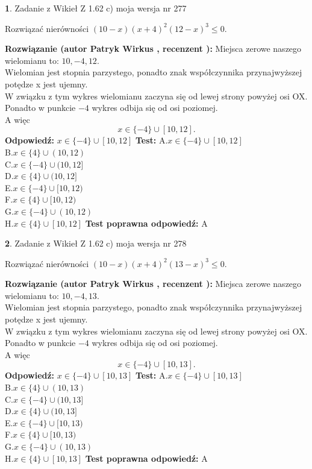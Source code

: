 \documentclass[12pt, a4paper]{article}
\theoremstyle{definition} %
\newtheorem{zad}{}
\newcommand{\zadStart}[1]{\begin{zad}#1\newline}
\newcommand{\zadStop}{\end{zad}}
\newcommand{\rozwStart}[2]{\noindent \textbf{Rozwiązanie (autor #1 , recenzent #2): }\newline}
\newcommand{\rozwStop}{\newline}
\newcommand{\odpStart}{\noindent \textbf{Odpowiedź:}\newline}
\newcommand{\odpStop}{\newline}
\newcommand{\testStart}{\noindent \textbf{Test:}\newline}
\newcommand{\testStop}{\newline}
\newcommand{\kluczStart}{\noindent \textbf{Test poprawna odpowiedź:}\newline}
\newcommand{\kluczStop}{\newline}
\begin{document}
\zadStart{Zadanie z Wikieł Z 1.62 c) moja wersja nr 277}

Rozwiązać nierówności $(10-x)(x+4)^{2}(12-x)^{3}\le0$.
\zadStop
\rozwStart{Patryk Wirkus}{}
Miejsca zerowe naszego wielomianu to: $10, -4, 12$.\\
Wielomian jest stopnia parzystego, ponadto znak współczynnika przy\linebreak najwyższej potędze x jest ujemny.\\ W związku z tym wykres wielomianu zaczyna się od lewej strony powyżej osi OX.\\
Ponadto w punkcie $-4$ wykres odbija się od osi poziomej.\\
A więc $$x \in \{-4\} \cup [10,12].$$
\rozwStop
\odpStart
$x \in \{-4\} \cup [10,12]$
\odpStop
\testStart
A.$x \in \{-4\} \cup [10,12]$\\
B.$x \in \{4\} \cup (10,12)$\\
C.$x \in \{-4\} \cup (10,12]$\\
D.$x \in \{4\} \cup (10,12]$\\
E.$x \in \{-4\} \cup [10,12)$\\
F.$x \in \{4\} \cup [10,12)$\\
G.$x \in \{-4\} \cup (10,12)$\\
H.$x \in \{4\} \cup [10,12]$
\testStop
\kluczStart
A
\kluczStop



\zadStart{Zadanie z Wikieł Z 1.62 c) moja wersja nr 278}

Rozwiązać nierówności $(10-x)(x+4)^{2}(13-x)^{3}\le0$.
\zadStop
\rozwStart{Patryk Wirkus}{}
Miejsca zerowe naszego wielomianu to: $10, -4, 13$.\\
Wielomian jest stopnia parzystego, ponadto znak współczynnika przy\linebreak najwyższej potędze x jest ujemny.\\ W związku z tym wykres wielomianu zaczyna się od lewej strony powyżej osi OX.\\
Ponadto w punkcie $-4$ wykres odbija się od osi poziomej.\\
A więc $$x \in \{-4\} \cup [10,13].$$
\rozwStop
\odpStart
$x \in \{-4\} \cup [10,13]$
\odpStop
\testStart
A.$x \in \{-4\} \cup [10,13]$\\
B.$x \in \{4\} \cup (10,13)$\\
C.$x \in \{-4\} \cup (10,13]$\\
D.$x \in \{4\} \cup (10,13]$\\
E.$x \in \{-4\} \cup [10,13)$\\
F.$x \in \{4\} \cup [10,13)$\\
G.$x \in \{-4\} \cup (10,13)$\\
H.$x \in \{4\} \cup [10,13]$
\testStop
\kluczStart
A
\kluczStop
\end{document}
